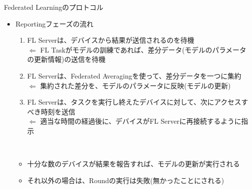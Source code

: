 \documentclass[dvipdfmx,notheorems,t]{beamer}
\begin{document}
\begin{frame}{Federated Learningのプロトコル}

\begin{itemize}
	\item Reportingフェーズの流れ
	\begin{enumerate}
		\item FL Serverは、デバイスから結果が送信されるのを待機 \\
		$\Leftarrow$ FL Taskがモデルの訓練であれば、差分データ(モデルのパラメータの更新情報)の送信を待機
		\newline
		
		\item FL Serverは、Federated Averagingを使って、差分データを一つに集約 \\
		$\Leftarrow$ 集約された差分を、モデルのパラメータに反映(モデルの更新)
		\newline
		
		\item FL Serverは、タスクを実行し終えたデバイスに対して、次にアクセスすべき時刻を送信 \\
		$\Leftarrow$ 適当な時間の経過後に、デバイスがFL Serverに再接続するように指示
	\end{enumerate} \
	
	\begin{itemize}
		\item 十分な数のデバイスが結果を報告すれば、モデルの更新が実行される
		\item それ以外の場合は、Roundの実行は失敗(無かったことにされる)
	\end{itemize}
\end{itemize}

\end{frame}
\end{document}
